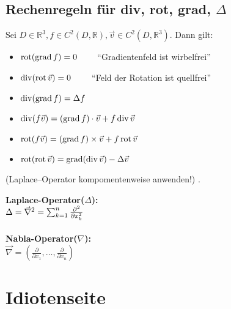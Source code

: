\subsection{Rechenregeln für div, rot, grad, $\Delta$}
\begin{minipage}{9cm}
Sei $D \in \mathbb{R}^3, f \in C^2(D,\mathbb{R}), \vec{v} \in C^2(D,\mathbb{R}^3)$. Dann gilt:
\begin{itemize}
	\item $\operatorname{rot}(\operatorname{grad} f) = 0 \qquad $ ``Gradientenfeld ist wirbelfrei''
	\item $\operatorname{div}(\operatorname{rot} \vec{v}) = 0 \qquad $ ``Feld der Rotation ist quellfrei''
	\item $\operatorname{div}(\operatorname{grad} f) = \Delta f$
	\item $\operatorname{div}(f\vec{v}) = (\operatorname{grad} f) \cdot \vec{v} + f \operatorname{div} \vec{v}$
	\item $\operatorname{rot}(f\vec{v}) = (\operatorname{grad} f) \times \vec{v} + f \operatorname{rot} \vec{v}$
	\item $\operatorname{rot}(\operatorname{rot} \vec{v}) = \operatorname{grad}(\operatorname{div} \vec{v}) - \Delta \vec{v}$
\end{itemize}
(Laplace–Operator kompomentenweise anwenden!) .
\end{minipage}
\hspace{1cm}
\begin{minipage}[b]{6cm}
\textbf{Laplace-Operator($\Delta$):}\\
$\Delta=\vec\nabla^2= \sum_{k=1}^n {\partial^2\over \partial x_k^2}$\\\\
\textbf{ Nabla-Operator($\nabla$):}\\
$\vec\nabla = \left (\frac\partial{\partial x_1},\ldots, \frac\partial{\partial
x_n}\right) $
\end{minipage}

\newpage
\section{Idiotenseite}



\begin{multicols}{2}
  
  \columnbreak
  
  
\end{multicols}
\begin{multicols}{2}
  
  \columnbreak
  
  
\end{multicols}


%


